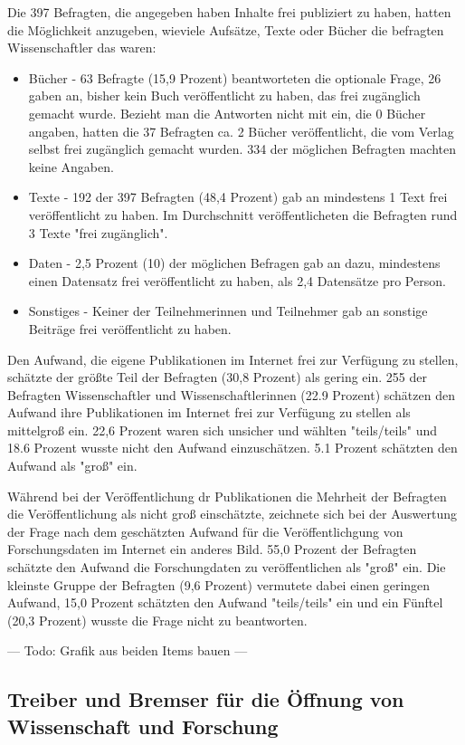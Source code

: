 Die 397 Befragten, die angegeben haben Inhalte frei publiziert zu haben, hatten die Möglichkeit anzugeben, wieviele Aufsätze, Texte oder Bücher die befragten Wissenschaftler das waren:
\begin{itemize}
\item Bücher - 63 Befragte (15,9 Prozent) beantworteten die optionale Frage, 26 gaben an, bisher kein Buch veröffentlicht zu haben, das frei zugänglich gemacht wurde. Bezieht man die Antworten nicht mit ein, die 0 Bücher angaben, hatten die 37 Befragten ca. 2 Bücher veröffentlicht, die vom Verlag selbst frei zugänglich gemacht wurden. 334 der möglichen Befragten machten keine Angaben.
\item Texte - 192 der 397 Befragten (48,4 Prozent) gab an mindestens 1 Text frei veröffentlicht zu haben. Im Durchschnitt veröffentlicheten die Befragten rund 3 Texte "frei zugänglich".
\item Daten - 2,5 Prozent (10) der möglichen Befragen gab an dazu, mindestens einen Datensatz frei veröffentlicht zu haben, als 2,4 Datensätze pro Person.
\item Sonstiges - Keiner der Teilnehmerinnen und Teilnehmer gab an sonstige Beiträge frei veröffentlicht zu haben.
\end{itemize}

Den Aufwand, die eigene Publikationen im Internet frei zur Verfügung zu stellen, schätzte der größte Teil der Befragten (30,8 Prozent) als gering ein. 255 der Befragten Wissenschaftler und Wissenschaftlerinnen (22.9 Prozent) schätzen den Aufwand ihre Publikationen im Internet frei zur Verfügung zu stellen als mittelgroß ein.  22,6 Prozent waren sich unsicher und wählten "teils/teils" und 18.6 Prozent wusste nicht den Aufwand einzuschätzen. 5.1 Prozent schätzten den Aufwand als "groß" ein.

Während bei der Veröffentlichung dr Publikationen die Mehrheit der Befragten die Veröffentlichung als nicht groß einschätzte, zeichnete sich bei der Auswertung der Frage nach dem geschätzten Aufwand für die Veröffentlichgung von Forschungsdaten im Internet ein anderes Bild. 55,0 Prozent der Befragten schätzte den Aufwand die Forschungdaten zu veröffentlichen als "groß" ein. Die kleinste Gruppe der Befragten (9,6 Prozent) vermutete dabei einen geringen Aufwand, 15,0 Prozent schätzten den Aufwand "teils/teils" ein und ein Fünftel (20,3 Prozent) wusste die Frage nicht zu beantworten.

--- Todo: Grafik aus beiden Items bauen ---

\subsection{Treiber und Bremser für die Öffnung von Wissenschaft und Forschung}

